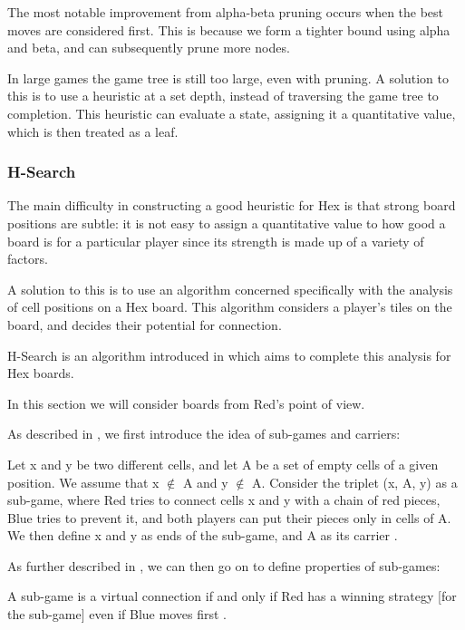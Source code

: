 The most notable improvement from alpha-beta pruning occurs when the best moves are considered first. This is because we form a tighter bound using alpha and beta, and can subsequently prune more nodes.

In large games the game tree is still too large, even with pruning. A solution to this is to use a heuristic at a set depth, instead of traversing the game tree to completion. This heuristic can evaluate a state, assigning it a quantitative value, which is then treated as a leaf. 



\subsubsection{H-Search}



The main difficulty in constructing a good heuristic for Hex is that strong board positions are subtle: it is not easy to assign a quantitative value to how good a board is for a particular player since its strength is made up of a variety of factors. 

A solution to this is to use an algorithm concerned specifically with the analysis of cell positions on a Hex board. This algorithm considers a player's tiles on the board, and decides their potential for connection.

H-Search is an algorithm introduced in \cite{HierarchicalHex} which aims to complete this analysis for Hex boards.

In this section we will consider boards from Red's point of view.

As described in \cite{HierarchicalHex}, we first introduce the idea of sub-games and carriers:


\begin{defn} \normalfont Let x and y be two different cells, and let A be a set of empty cells of a given
position. We assume that x $\notin$ A and y $\notin$ A. Consider the triplet (x, A, y) as a sub-game,
where Red tries to connect cells x and y with a chain of red pieces, Blue tries to
prevent it, and both players can put their pieces only in cells of A. We then define x and y
as ends of the sub-game, and A as its carrier \cite{HierarchicalHex}.\end{defn}



As further described in \cite{HierarchicalHex}, we can then go on to define properties of sub-games:

\begin{defn} \normalfont A sub-game is a virtual connection if and only if Red has a winning strategy [for the sub-game] even if
Blue moves first \cite{HierarchicalHex}.\end{defn}

